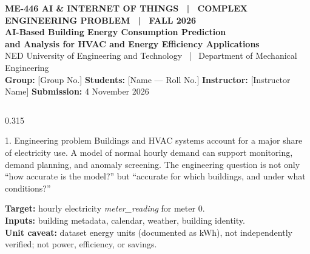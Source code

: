 \documentclass[final]{beamer}
\begin{document}
\begin{frame}[t]
\begin{tcolorbox}[colback=navy,colframe=navy,arc=0pt,boxrule=0pt,left=0pt,right=0pt,top=0pt,bottom=0pt]
\color{white}
\begin{flushleft}
{\color{teal}\large\textbf{ME-446 AI \& INTERNET OF THINGS \ | \ COMPLEX ENGINEERING PROBLEM \ | \ FALL 2026}}\\[0.25cm]
{\Huge\bfseries AI-Based Building Energy Consumption Prediction\\[0.08cm] and Analysis for HVAC and Energy Efficiency Applications}\\[0.25cm]
{\Large NED University of Engineering and Technology \ | \ Department of Mechanical Engineering}\\[0.18cm]
{\large \textbf{Group:} [Group No.] \quad \textbf{Students:} [Name --- Roll No.] \quad \textbf{Instructor:} [Instructor Name] \quad \textbf{Submission:} 4 November 2026}
\end{flushleft}
\end{tcolorbox}

\vspace{0.3cm}
\begin{columns}[t]

\begin{column}{0.315\paperwidth}
\begin{block}{1. Engineering problem}
Buildings and HVAC systems account for a major share of electricity use. A model of normal hourly demand can support monitoring, demand planning, and anomaly screening. The engineering question is not only ``how accurate is the model?'' but ``accurate for which buildings, and under what conditions?''

\begin{tcolorbox}[colback=paleorange,colframe=orange,boxrule=1pt,arc=2pt,left=4pt,right=4pt,top=3pt,bottom=3pt]
\small
\textbf{Target:} hourly electricity \emph{meter\_reading} for meter 0.\\
\textbf{Inputs:} building metadata, calendar, weather, building identity.\\
\textbf{Unit caveat:} dataset energy units (documented as kWh), not independently verified; not power, efficiency, or savings.
\end{tcolorbox}
\end{block}


\end{column}
\end{columns}
\end{frame}
\end{document}
